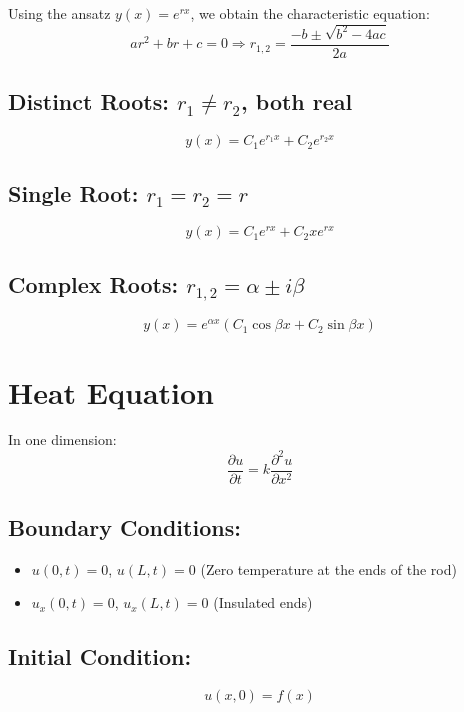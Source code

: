 \documentclass[a4paper,12pt]{article}
\begin{document}
Using the ansatz $y(x) = e^{rx}$, we obtain the characteristic equation:
\begin{equation*}
    a r^2 + b r + c = 0 \Rightarrow r_{1,2} = \frac{-b \pm \sqrt{b^2 - 4ac}}{2a}
\end{equation*}

\subsection*{Distinct Roots: $r_1 \neq r_2$, both real}
\begin{equation*}
    y(x) = C_1 e^{r_1 x} + C_2 e^{r_2 x}
\end{equation*}

\subsection*{Single Root: $r_1 = r_2 = r$}
\begin{equation*}
    y(x) = C_1 e^{r x} + C_2 x e^{r x}
\end{equation*}

\subsection*{Complex Roots: $r_{1,2} = \alpha \pm i\beta$}
\begin{equation*}
    y(x) = e^{\alpha x} \left( C_1 \cos \beta x + C_2 \sin \beta x \right)
\end{equation*}
\newpage
\section*{Heat Equation}
In one dimension:
\begin{equation*}
    \frac{\partial u}{\partial t} = k \frac{\partial^2 u}{\partial x^2}
\end{equation*}

\subsection*{Boundary Conditions:}
\begin{itemize}
    \item $u(0,t) = 0$, $u(L,t) = 0$ (Zero temperature at the ends of the rod)
    \item $u_x(0,t) = 0$, $u_x(L,t) = 0$ (Insulated ends)
\end{itemize}

\subsection*{Initial Condition:}
\begin{equation*}
    u(x,0) = f(x)
\end{equation*}
\end{document}
